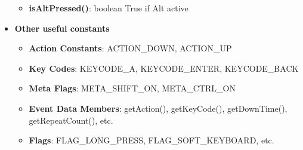 \documentclass{report}
\begin{document}
\begin{itemize}
\begin{itemize}
                \item \textbf{isAltPressed()}:	boolean	True if Alt active 
            \end{itemize}
        \item \textbf{Other useful constants}
            \begin{itemize}
                \item \textbf{Action Constants}:	ACTION\_DOWN, ACTION\_UP
                \item \textbf{Key Codes}:	KEYCODE\_A, KEYCODE\_ENTER, KEYCODE\_BACK
                \item \textbf{Meta Flags}:	META\_SHIFT\_ON, META\_CTRL\_ON
                \item \textbf{Event Data Members}:	getAction(), getKeyCode(), getDownTime(), getRepeatCount(), etc.
                \item \textbf{Flags}:	FLAG\_LONG\_PRESS, FLAG\_SOFT\_KEYBOARD, etc.
            \end{itemize}

    \end{itemize}
    
    \pagebreak 
\end{document}
